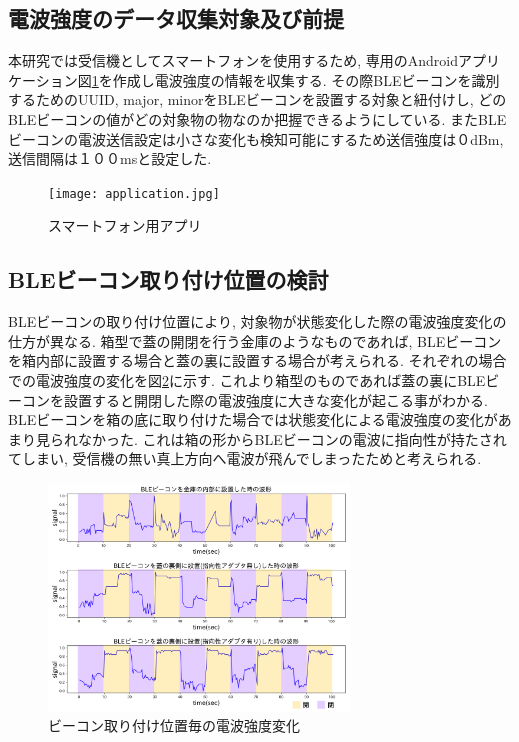 \documentclass[Japanese]{dicomopapers}
\begin{document}

\subsection{電波強度のデータ収集対象及び前提}

本研究では受信機としてスマートフォンを使用するため, 専用のAndroidアプリケーション図\ref{phoneApp}を作成し電波強度の情報を収集する.
その際BLEビーコンを識別するためのUUID, major, minorをBLEビーコンを設置する対象と紐付けし, どのBLEビーコンの値がどの対象物の物なのか把握できるようにしている.
またBLEビーコンの電波送信設定は小さな変化も検知可能にするため送信強度は０dBm, 送信間隔は１００msと設定した.

\begin{figure}[ht]
    \centering
    \texttt{[image: application.jpg]}
    \caption{スマートフォン用アプリ}
    \label{phoneApp}
\end{figure}






\subsection{BLEビーコン取り付け位置の検討}
BLEビーコンの取り付け位置により, 対象物が状態変化した際の電波強度変化の仕方が異なる.
箱型で蓋の開閉を行う金庫のようなものであれば, BLEビーコンを箱内部に設置する場合と蓋の裏に設置する場合が考えられる.
それぞれの場合での電波強度の変化を図\ref{transform-data}に示す.
これより箱型のものであれば蓋の裏にBLEビーコンを設置すると開閉した際の電波強度に大きな変化が起こる事がわかる.
BLEビーコンを箱の底に取り付けた場合では状態変化による電波強度の変化があまり見られなかった.
これは箱の形からBLEビーコンの電波に指向性が持たされてしまい, 受信機の無い真上方向へ電波が飛んでしまったためと考えられる.

\begin{figure}[t]
 \centering
 \includegraphics[width=8cm]{in-out.png}
 \caption{ビーコン取り付け位置毎の電波強度変化}
 \label{transform-data}
\end{figure}
\end{document}
